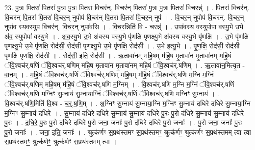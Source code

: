 \documentclass[17pt]{extarticle}
\begin{document}
23. पु॒त्रः पि॒तरा॑ पि॒तरा॑ पु॒त्रः पु॒त्रः पि॒तरा॑ वि॒चर॑न्. वि॒चर॑न् पि॒तरा॑ पु॒त्रः पु॒त्रः पि॒तरा॑ वि॒चरन्न्॑ । . पि॒तरा॑ वि॒चर॑न्. वि॒चर॑न् पि॒तरा॑ पि॒तरा॑ वि॒चर॒न् नुपोप॑ वि॒चर॑न् पि॒तरा॑ पि॒तरा॑ वि॒चर॒न् नुप॑ । . वि॒चर॒न् नुपोप॑ वि॒चर॑न्. वि॒चर॒न् नुपा॑व स्यव॒स्युप॑ वि॒चर॑न्. वि॒चर॒न् नुपा॑वसि । . वि॒चर॒न्निति॑ वि - चरन्न्॑ । . उपा॑वस्य व॒स्युपोपा॑ वस्यु॒भे उ॒भे अ॑व॒ स्युपोपा॑ वस्यु॒भे । . अ॒व॒स्यु॒भे उ॒भे अ॑वस्य वस्यु॒भे पृ॑णक्षि पृणक्ष्यु॒भे अ॑वस्य वस्यु॒भे पृ॑णक्षि । . उ॒भे पृ॑णक्षि पृणक्ष्यु॒भे उ॒भे पृ॑णक्षि॒ रोद॑सी॒ रोद॑सी पृणक्ष्यु॒भे उ॒भे पृ॑णक्षि॒ रोद॑सी । . उ॒भे इत्यु॒भे । . पृ॒ण॒क्षि॒ रोद॑सी॒ रोद॑सी पृणक्षि पृणक्षि॒ रोद॑सी । . रोद॑सी॒ इति॒ रोद॑सी । . ऋ॒तावा॑नम् महि॒षम् म॑हि॒ष मृ॒तावा॑न मृ॒तावा॑नम् महि॒षं ॅवि॒श्वच॑र्.षणिं ॅवि॒श्वच॑र्.षणिम् महि॒ष मृ॒तावा॑न मृ॒तावा॑नम् महि॒षं ॅवि॒श्वच॑र्.षणिम् । . ऋ॒तावा॑न॒मित्यृ॒त - वा॒न॒म् । . म॒हि॒षं ॅवि॒श्वच॑र्.षणिं ॅवि॒श्वच॑र्.षणिम् महि॒षम् म॑हि॒षं ॅवि॒श्वच॑र्.षणि म॒ग्नि म॒ग्निं ॅवि॒श्वच॑र्.षणिम् महि॒षम् म॑हि॒षं ॅवि॒श्वच॑र्.षणि म॒ग्निम् । . वि॒श्वच॑र्.षणि म॒ग्नि म॒ग्निं ॅवि॒श्वच॑र्.षणिं ॅवि॒श्वच॑र्.षणि म॒ग्निꣳ सु॒म्नाय॑ सु॒म्नाया॒ग्निं ॅवि॒श्वच॑र्.षणिं ॅवि॒श्वच॑र्.षणि म॒ग्निꣳ सु॒म्नाय॑ । . वि॒श्वच॑र्.षणि॒मिति॑ वि॒श्व - च॒र्॒.ष॒णि॒म् । . अ॒ग्निꣳ सु॒म्नाय॑ सु॒म्नाया॒ग्नि म॒ग्निꣳ सु॒म्नाय॑ दधिरे दधिरे सु॒म्नाया॒ग्नि म॒ग्निꣳ सु॒म्नाय॑ दधिरे । . सु॒म्नाय॑ दधिरे दधिरे सु॒म्नाय॑ सु॒म्नाय॑ दधिरे पु॒रः पु॒रो द॑धिरे सु॒म्नाय॑ सु॒म्नाय॑ दधिरे पु॒रः । . द॒धि॒रे॒ पु॒रः पु॒रो द॑धिरे दधिरे पु॒रो जना॒ जनाः᳚ पु॒रो द॑धिरे दधिरे पु॒रो जनाः᳚ । . पु॒रो जना॒ जनाः᳚ पु॒रः पु॒रो जनाः᳚ । . जना॒ इति॒ जनाः᳚ । . श्रुत्क॑र्णꣳ स॒प्रथ॑स्तमꣳ स॒प्रथ॑स्तमꣳ॒॒ श्रुत्क॑र्णꣳ॒॒ श्रुत्क॑र्णꣳ स॒प्रथ॑स्तमम् त्वा त्वा स॒प्रथ॑स्तमꣳ॒॒ श्रुत्क॑र्णꣳ॒॒ श्रुत्क॑र्णꣳ स॒प्रथ॑स्तमम् त्वा । \newline
\end{document}
